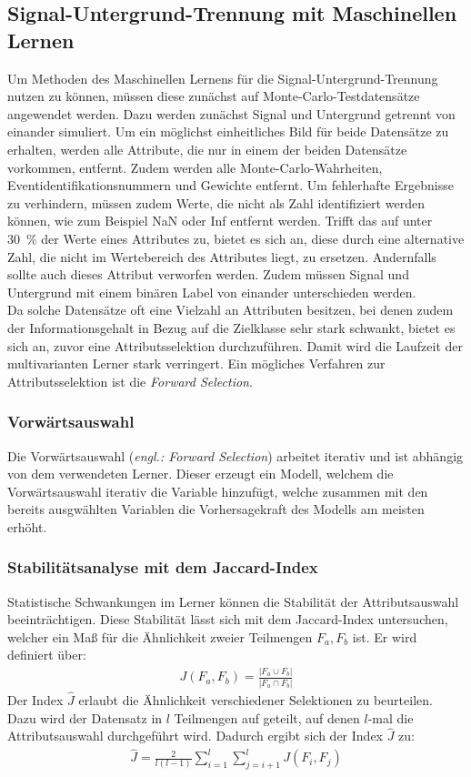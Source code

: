 \subsection{Signal-Untergrund-Trennung mit Maschinellen Lernen}
\label{Signal}
Um Methoden des Maschinellen Lernens für die Signal-Untergrund-Trennung nutzen zu können, müssen diese zunächst auf Monte-Carlo-Testdatensätze angewendet werden. Dazu werden zunächst Signal und Untergrund getrennt von einander simuliert. Um ein möglichst einheitliches Bild für beide Datensätze zu erhalten, werden alle Attribute, die nur in einem der beiden Datensätze vorkommen, entfernt. Zudem werden alle Monte-Carlo-Wahrheiten, Eventidentifikationsnummern und Gewichte entfernt. Um fehlerhafte Ergebnisse zu verhindern, müssen zudem Werte, die nicht als Zahl identifiziert werden können, wie zum Beispiel NaN oder Inf entfernt werden. Trifft das auf unter \SI{30}{\percent} der Werte eines Attributes zu, bietet es sich an, diese durch eine alternative Zahl, die nicht im Wertebereich des Attributes liegt, zu ersetzen. Andernfalls sollte auch dieses Attribut verworfen werden. Zudem müssen Signal und Untergrund mit einem binären Label von einander unterschieden werden.\\
Da solche Datensätze oft eine Vielzahl an Attributen besitzen, bei denen zudem der Informationsgehalt in Bezug auf die Zielklasse sehr stark schwankt, bietet es sich an, zuvor eine Attributsselektion durchzuführen. Damit wird die Laufzeit der multivarianten Lerner stark verringert. Ein mögliches Verfahren zur Attributsselektion ist die \textit{Forward Selection}.
\subsubsection{Vorwärtsauswahl}
Die Vorwärtsauswahl (\textit{engl.: Forward Selection}) arbeitet iterativ und ist abhängig von dem verwendeten Lerner. Dieser erzeugt ein Modell, welchem die Vorwärtsauswahl iterativ die Variable hinzufügt, welche zusammen mit den bereits ausgwählten Variablen die Vorhersagekraft des Modells am meisten erhöht.
\subsubsection{Stabilitätsanalyse mit dem Jaccard-Index}
Statistische Schwankungen im Lerner können die Stabilität der Attributsauswahl beeinträchtigen. Diese Stabilität lässt sich mit dem Jaccard-Index untersuchen, welcher ein Maß für die Ähnlichkeit zweier Teilmengen $F_{a},F_{b}$ ist. Er wird definiert über:
\begin{align}
	J(F_{a},F_{b}) = \frac{|F_{a} \cup F_{b}|}{|F_{a} \cap F_{b}|}
\end{align}
Der Index $\hat{J}$ erlaubt die Ähnlichkeit verschiedener Selektionen zu beurteilen. Dazu wird der Datensatz in $l$ Teilmengen auf geteilt, auf denen $l$-mal die Attributsauswahl durchgeführt wird. Dadurch ergibt sich der Index $\hat{J}$ zu:
\begin{align}
	\hat{J} = \frac{2}{l(l-1)} \sum^{l}_{i=1} \sum^{l}_{j=i+1} J(F_{i},F_{j})
\end{align}

